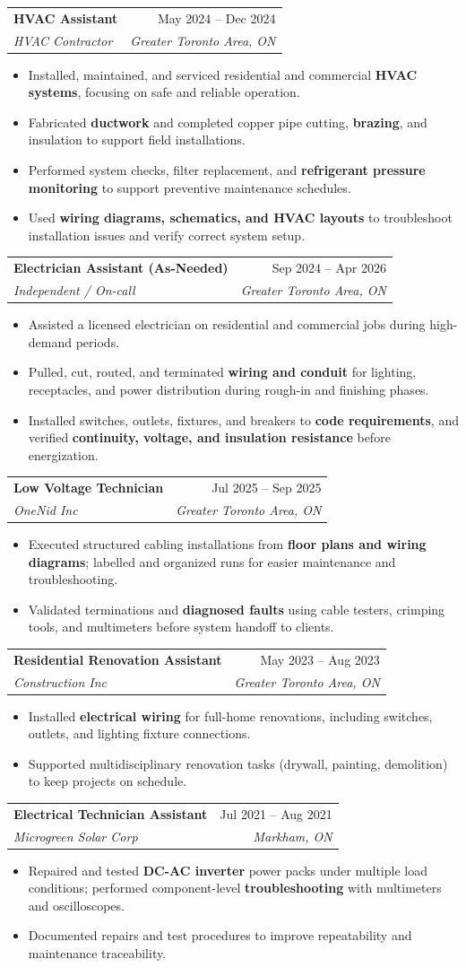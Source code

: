 \documentclass[letterpaper,11pt]{article}
\makeatletter
\newcommand{\resumeItem}[1]{\item\small{{#1 \vspace{-2pt}}}}
\newcommand{\resumeSubheading}[4]{
  \vspace{-2pt}\item
    \begin{tabular*}{0.97\textwidth}[t]{l@{\extracolsep{\fill}}r}
      \textbf{#1} & #2 \\
      \textit{\small #3} & \textit{\small #4} \\
    \end{tabular*}\vspace{-7pt}
}
\newcommand{\resumeItemListStart}{\begin{itemize}}
\newcommand{\resumeItemListEnd}{\end{itemize}\vspace{-5pt}}
\makeatother
\begin{document}
\resumeSubheading
  {HVAC Assistant}{May 2024 -- Dec 2024}
  {HVAC Contractor}{Greater Toronto Area, ON}
\resumeItemListStart
  \resumeItem{Installed, maintained, and serviced residential and commercial \textbf{HVAC systems}, focusing on safe and reliable operation.}
  \resumeItem{Fabricated \textbf{ductwork} and completed copper pipe cutting, \textbf{brazing}, and insulation to support field installations.}
  \resumeItem{Performed system checks, filter replacement, and \textbf{refrigerant pressure monitoring} to support preventive maintenance schedules.}
  \resumeItem{Used \textbf{wiring diagrams, schematics, and HVAC layouts} to troubleshoot installation issues and verify correct system setup.}
\resumeItemListEnd

\resumeSubheading
  {Electrician Assistant (As-Needed)}{Sep 2024 -- Apr 2026}
  {Independent / On-call}{Greater Toronto Area, ON}
\resumeItemListStart
  \resumeItem{Assisted a licensed electrician on residential and commercial jobs during high-demand periods.}
  \resumeItem{Pulled, cut, routed, and terminated \textbf{wiring and conduit} for lighting, receptacles, and power distribution during rough-in and finishing phases.}
  \resumeItem{Installed switches, outlets, fixtures, and breakers to \textbf{code requirements}, and verified \textbf{continuity, voltage, and insulation resistance} before energization.}
\resumeItemListEnd

\resumeSubheading
  {Low Voltage Technician}{Jul 2025 -- Sep 2025}
  {OneNid Inc}{Greater Toronto Area, ON}
\resumeItemListStart
  \resumeItem{Executed structured cabling installations from \textbf{floor plans and wiring diagrams}; labelled and organized runs for easier maintenance and troubleshooting.}
  \resumeItem{Validated terminations and \textbf{diagnosed faults} using cable testers, crimping tools, and multimeters before system handoff to clients.}
\resumeItemListEnd

\resumeSubheading
  {Residential Renovation Assistant}{May 2023 -- Aug 2023}
  {Construction Inc}{Greater Toronto Area, ON}
\resumeItemListStart
  \resumeItem{Installed \textbf{electrical wiring} for full-home renovations, including switches, outlets, and lighting fixture connections.}
  \resumeItem{Supported multidisciplinary renovation tasks (drywall, painting, demolition) to keep projects on schedule.}
\resumeItemListEnd

\resumeSubheading
  {Electrical Technician Assistant}{Jul 2021 -- Aug 2021}
  {Microgreen Solar Corp}{Markham, ON}
\resumeItemListStart
  \resumeItem{Repaired and tested \textbf{DC-AC inverter} power packs under multiple load conditions; performed component-level \textbf{troubleshooting} with multimeters and oscilloscopes.}
  \resumeItem{Documented repairs and test procedures to improve repeatability and maintenance traceability.}
\resumeItemListEnd
\end{document}
